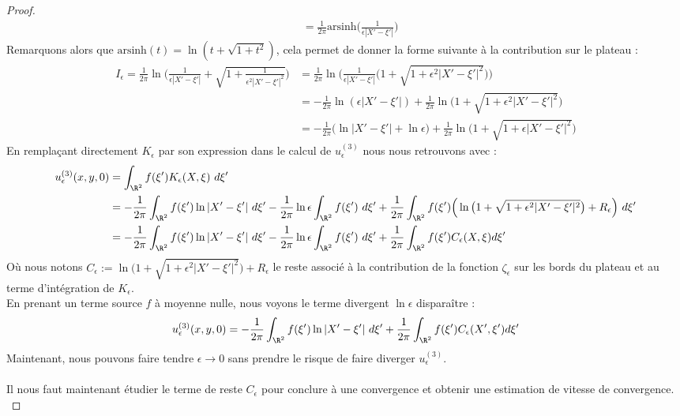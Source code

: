 \begin{proof}
\begin{align*}
    &= \frac{1}{2\pi} \text{arsinh}\Big(\frac{1}{\epsilon |X' - \xi'|}\Big)
\end{align*}
Remarquons alors que $\text{arsinh}(t) = \ln(t + \sqrt{1 + t^2})$, cela permet de donner la forme suivante à la contribution sur le plateau : 
\begin{align*}
    I_{\epsilon} = \frac{1}{2\pi} \ln\bigg( \frac{1}{\epsilon |X' - \xi'|} + \sqrt{1 + \frac{1}{\epsilon^2 |X' - \xi'|^2}} \bigg) &= \frac{1}{2\pi} \ln \bigg( \frac{1}{\epsilon |X' - \xi'|} \Big(1 + \sqrt{1 + \epsilon^2 |X' - \xi'|^2}\Big) \bigg) \\
    &= - \frac{1}{2\pi} \ln (\epsilon |X' - \xi'|) + \frac{1}{2\pi} \ln \big( 1 + \sqrt{1 + \epsilon^2 |X' - \xi'|^2} \big) \\
    &= -\frac{1}{2\pi} \Big( \ln |X' - \xi'| + \ln\epsilon \Big) + \frac{1}{2\pi}\ln\big( 1 + \sqrt{1 + \epsilon |X' - \xi'|^2}\big)
\end{align*}
En remplaçant directement $K_{\epsilon}$ par son expression dans le calcul de $u^{(3)}_{\epsilon}$ nous nous retrouvons avec :
\begin{align*}
    u^{(3)}_{\epsilon}(x,y,0) &= \int_{\R^2} f(\xi')K_{\epsilon}(X,\xi) \ d\xi' \\
    &= - \frac{1}{2\pi}\int_{\R^2} f(\xi')\ln |X' - \xi'| \ d\xi' - \frac{1}{2\pi} \ln \epsilon \int_{\R^2} f(\xi') \ d\xi' + \frac{1}{2\pi}\int_{\R^2} f(\xi')\Big(\ln \big(1 + \sqrt{1 + \epsilon^2 |X' - \xi'|^2}\big) + R_{\epsilon}\Big) \ d\xi' \\
    &= - \frac{1}{2\pi}\int_{\R^2} f(\xi')\ln |X' - \xi'| \ d\xi' - \frac{1}{2\pi} \ln \epsilon \int_{\R^2} f(\xi') \ d\xi' + \frac{1}{2\pi}\int_{\R^2} f(\xi')C_{\epsilon}(X,\xi) d \xi'
\end{align*}
Où nous notons $C_{\epsilon} := \ln \big(1 + \sqrt{1 + \epsilon^2 |X' - \xi'|^2}\big) + R_{\epsilon}$ le reste associé à la contribution de la fonction $\zeta_{\epsilon}$ sur les bords du plateau et au terme d'intégration de $K_{\epsilon}$.\\
En prenant un terme source $f$ à moyenne nulle, nous voyons le terme divergent $\ln \epsilon$ disparaître : 
$$ u_{\epsilon}^{(3)}(x,y,0) = - \frac{1}{2\pi}\int_{\R^2} f(\xi')\ln |X' - \xi'| \ d\xi' + \frac{1}{2\pi}\int_{\R^2} f(\xi')C_{\epsilon}(X',\xi') d \xi' $$
Maintenant, nous pouvons faire tendre $\epsilon \to 0$ sans prendre le risque de faire diverger $u^{(3)}_{\epsilon}$. \\
\\
Il nous faut maintenant étudier le terme de reste $C_{\epsilon}$ pour conclure à une convergence et obtenir une estimation de vitesse de convergence. \\

\end{proof}
